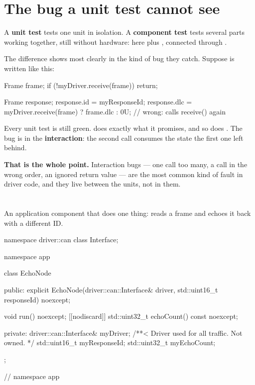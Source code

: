 \section{The bug a unit test cannot see}
\label{sec:interaction}

A \textbf{unit test} tests one unit in isolation. A \textbf{component test} tests several parts
working together, still without hardware: here  plus
, connected through .

The difference shows most clearly in the kind of bug they catch. Suppose  is written
like this:

\begin{cppcode}
Frame frame{};
if (!myDriver.receive(frame)) { return; }

Frame response{};
response.id  = myResponseId;
response.dlc = myDriver.receive(frame) ? frame.dlc : 0U;   // wrong: calls receive() again
\end{cppcode}

Every unit test is still green.  does exactly what it promises, and so does
. The bug is in the \textbf{interaction}: the second call consumes the state the first
one left behind.

\textbf{That is the whole point.} Interaction bugs --- one call too many, a call in the wrong
order, an ignored return value --- are the most common kind of fault in driver code, and they live
between the units, not in them.

\section{\texorpdfstring{}{app::EchoNode}}
\label{sec:echonode}

An application component that does one thing: reads a frame and echoes it back with a different
ID.

\begin{cppcode}
namespace driver::can { class Interface; }

namespace app
{
class EchoNode
{
public:
    explicit EchoNode(driver::can::Interface& driver, std::uint16_t responseId) noexcept;

    void run() noexcept;
    [[nodiscard]] std::uint32_t echoCount() const noexcept;

private:
    driver::can::Interface& myDriver; /**< Driver used for all traffic. Not owned. */
    std::uint16_t myResponseId;
    std::uint32_t myEchoCount;
};
} // namespace app
\end{cppcode}


